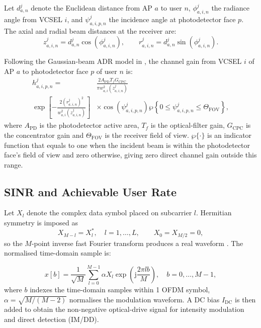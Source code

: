 \documentclass[journal]{IEEEtran}
\begin{document}
Let $d_{a,n}^{j}$ denote the Euclidean distance from AP $a$ to user $n$, $\phi_{a,i,n}^{j}$ the radiance angle from VCSEL $i$, and $\psi_{a,i,p,n}^{j}$ the incidence angle at photodetector face $p$. The axial and radial beam distances at the receiver are:
\begin{equation}
    z_{a,i,n}^{j}
    =
    d_{a,n}^{j}
    \cos\!\left(\phi_{a,i,n}^{j}\right),
    \qquad
    r_{a,i,n}^{j}
    =
    d_{a,n}^{j}
    \sin\!\left(\phi_{a,i,n}^{j}\right).
    \label{eq:beam_coordinates}
\end{equation}

Following the Gaussian-beam ADR model in \cite{Sarbazi2024Receiver,11673253}, the channel gain from VCSEL $i$ of AP $a$ to photodetector face $p$ of user $n$ is:
\begin{align}
    h_{a,i,p,n}^{j}
    ={}&
    \frac{
    2A_{\mathrm{PD}}
    T_f
    G_{\mathrm{CPC}}
    }
    {
    \pi w_{a,i}^{2}(z_{a,i,n}^{j})
    }\\
    \exp\!\left[
    -\frac{
    2(r_{a,i,n}^{j})^{2}
    }{
    w_{a,i}^{2}(z_{a,i,n}^{j})
    }
    \right]
    \nonumber
    &\times
    \cos\!\left(\psi_{a,i,p,n}^{j}\right)
    {\wp}\!\left\{
    0\leq\psi_{a,i,p,n}^{j}
    \leq\Theta_{\mathrm{FOV}}
    \right\},
    \label{eq:optical_channel_gain}
\end{align}
where $A_{\mathrm{PD}}$ is the photodetector active area, $T_f$ is the optical-filter gain, $G_{\mathrm{CPC}}$ is the concentrator gain and $\Theta_{\mathrm{FOV}}$ is the receiver field of view. ${\wp}\{\cdot\}$ is an indicator function that equals to one when the
incident beam is within the photodetector face's field of view and
zero otherwise, giving zero direct channel gain outside this range. 


\subsection{SINR and Achievable User Rate}

Let $X_{l}$ denote the complex data symbol placed on subcarrier $l$. Hermitian symmetry is imposed as
\begin{equation}
    X_{M-l}=X_{l}^{*},\quad l=1,\ldots,L,
    \qquad X_{0}=X_{M/2}=0,
    \label{eq:hermitian_symmetry}
\end{equation}
so the $M$-point inverse fast Fourier transform produces a real waveform \cite{Tsonev2015,Sarbazi2024Receiver}. The normalised time-domain sample is:

\begin{equation}
x[b]=\frac{1}{\sqrt{M}}
\sum_{l=0}^{M-1}\alpha X_l
\exp\!\left(\mathrm{j}\frac{2\pi lb}{M}\right),
\quad b=0,\ldots,M-1,
\label{eq:dco_ofdm_signal}
\end{equation}
where $b$ indexes the time-domain samples within 1 OFDM symbol,  $\alpha=\sqrt{M/(M-2)}$ normalises the modulation waveform. A DC bias $I_{\mathrm{DC}}$ is then added to obtain the non-negative optical-drive signal for intensity modulation and direct detection (IM/DD).
\end{document}
